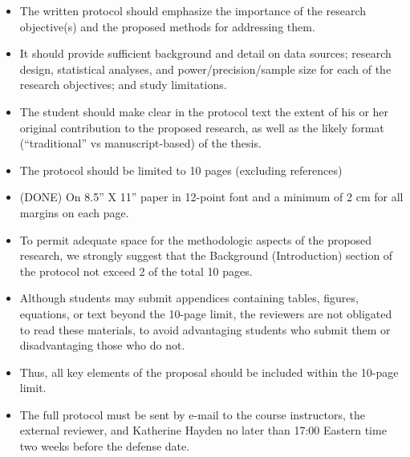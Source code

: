 \begin{itemize}
    \item The written protocol should emphasize the importance of the research objective(s) and the proposed methods for addressing them.
    \item It should provide sufficient background and detail on data sources; research design, statistical analyses, and power/precision/sample size for each of the research objectives; and study limitations.
    \item The student should make clear in the protocol text the extent of his or her original contribution to the proposed research, as well as the likely format (“traditional” vs manuscript-based) of the thesis.
    \item The protocol should be limited to 10 pages (excluding references)
    \item (DONE) On 8.5” X 11” paper in 12-point font and a minimum of 2 cm for all margins on each page.
    \item To permit adequate space for the methodologic aspects of the proposed research, we strongly suggest that the Background (Introduction) section of the protocol not exceed 2 of the total 10 pages.
    \item Although students may submit appendices containing tables, figures, equations, or text beyond the 10-page limit, the reviewers are not obligated to read these materials, to avoid advantaging students who submit them or disadvantaging those who do not.
    \item Thus, all key elements of the proposal should be included within the 10-page limit.
    \item The full protocol must be sent by e-mail to the course instructors, the external reviewer, and Katherine Hayden no later than 17:00 Eastern time two weeks before the defense date.
\end{itemize}



